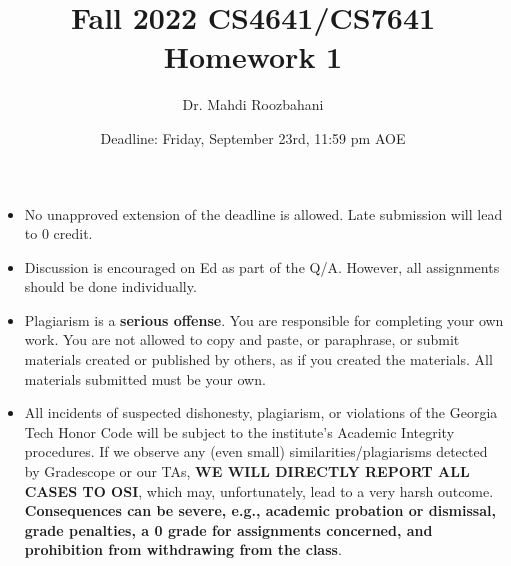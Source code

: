 \documentclass{article}
\title{Fall 2022 CS4641/CS7641 Homework 1}
\author{Dr. Mahdi Roozbahani}
\date{Deadline: Friday, September 23rd, 11:59 pm AOE}
\begin{document}
\maketitle
\begin{itemize}
    \item No unapproved extension of the deadline is allowed. Late submission will lead to 0 credit.
    \item Discussion is encouraged on Ed as part of the Q/A. However, all assignments should be done individually.
    \item \color{red}Plagiarism is a \textbf{serious offense}. You are responsible for completing your own work. You are not allowed to copy and paste, or paraphrase, or submit materials created or published by others, as if you created the materials. All materials submitted must be your own.\color{black}
    \item \color{red}All incidents of suspected dishonesty, plagiarism, or violations of the Georgia Tech Honor Code will be subject to the institute’s Academic Integrity procedures. If we observe any (even small) similarities/plagiarisms detected by Gradescope or our TAs, \textbf{WE WILL DIRECTLY REPORT ALL CASES TO OSI}, which may, unfortunately, lead to a very harsh outcome. \textbf{Consequences can be severe, e.g., academic probation or dismissal, grade penalties, a 0 grade for assignments concerned, and prohibition from withdrawing from the class}.
\end{itemize}
\end{document}
